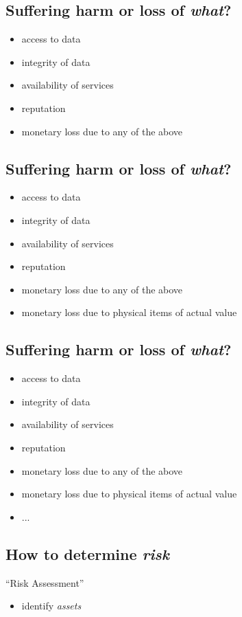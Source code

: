 \documentclass[xga]{xdvislides}
\begin{document}
\subsection{Suffering harm or loss of {\em what}?}

\begin{itemize}
	\item access to data
	\item integrity of data
	\item availability of services
	\item reputation
	\item monetary loss due to any of the above
\end{itemize}

\subsection{Suffering harm or loss of {\em what}?}

\begin{itemize}
	\item access to data
	\item integrity of data
	\item availability of services
	\item reputation
	\item monetary loss due to any of the above
	\item monetary loss due to physical items of actual value
\end{itemize}

\subsection{Suffering harm or loss of {\em what}?}

\begin{itemize}
	\item access to data
	\item integrity of data
	\item availability of services
	\item reputation
	\item monetary loss due to any of the above
	\item monetary loss due to physical items of actual value
	\item ...
\end{itemize}


\subsection{How to determine {\em risk}}
``Risk Assessment''
\begin{itemize}
	\item identify {\em assets}
\end{itemize}
\end{document}
